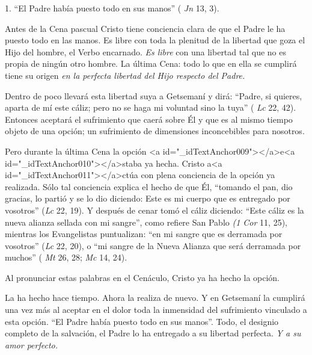			\begin{body} 1. “El Padre había puesto todo en sus manos” ( \textit{Jn} 13, 3). \end{body}
			
			\begin{body}Antes de la Cena pascual Cristo tiene conciencia clara de que el Padre le ha puesto todo en las manos. Es libre con toda la plenitud de la libertad que goza el Hijo del hombre, el Verbo encarnado. \textit{Es libre} con una libertad tal que no es propia de ningún otro hombre. La última Cena: todo lo que en ella se cumplirá tiene su origen \textit{en la perfecta libertad del Hijo respecto del Padre.}\end{body}
			
			\begin{body}Dentro de poco llevará esta libertad suya a Getsemaní y dirá: “Padre, si quieres, aparta de mí este cáliz; pero no se haga mi voluntad sino la tuya” ( \textit{Lc} 22, 42). Entonces aceptará el sufrimiento que caerá sobre Él y que es al mismo tiempo objeto de una opción; un sufrimiento de dimensiones inconcebibles para nosotros. \end{body}
			
			\begin{body}Pero durante la última Cena la opción <a id="_idTextAnchor009"></a>e<a id="_idTextAnchor010"></a>staba ya hecha. Cristo a<a id="_idTextAnchor011"></a>ctúa con plena conciencia de la opción ya realizada. Sólo tal conciencia explica el hecho de que Él, “tomando el pan, dio gracias, lo partió y se lo dio diciendo: Este es mi cuerpo que es entregado por vosotros” (\textit{Lc} 22, 19). Y después de cenar tomó el cáliz diciendo: “Este cáliz es la nueva alianza sellada con mi sangre”, como refiere San Pablo \textit{(1 Cor} 11, 25), mientras los Evangelistas puntualizan: “en mi sangre que es derramada por vosotros” (\textit{Lc} 22, 20), o “mi sangre de la Nueva Alianza que será derramada por muchos” ( \textit{Mt} 26, 28; \textit{Mc} 14, 24). \end{body}
			
			\begin{body}Al pronunciar estas palabras en el Cenáculo, Cristo ya ha hecho la opción. \end{body}
			
			\begin{body}La ha hecho hace tiempo. Ahora la realiza de nuevo. Y en Getsemaní la cumplirá una vez más al aceptar en el dolor toda la inmensidad del sufrimiento vinculado a esta opción. “El Padre había puesto todo en sus manos”. Todo, el designio completo de la salvación, el Padre lo ha entregado a su libertad perfecta. \textit{Y a su amor perfecto.}\end{body}
			
